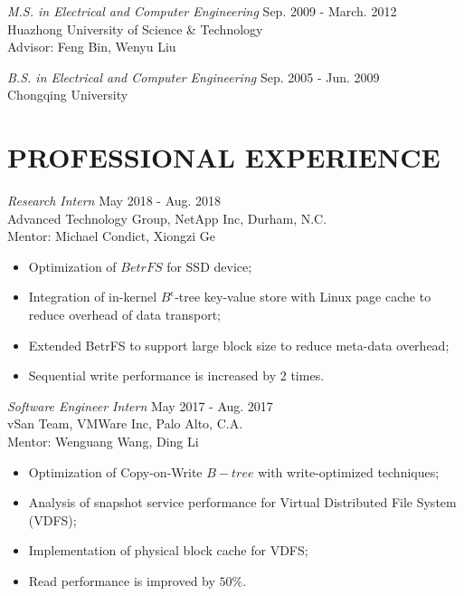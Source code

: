 \documentclass[margin, 10pt]{res} %
\begin{document}
\begin{resume}
{\sl M.S. in Electrical and Computer Engineering} \hfill Sep. 2009 - March. 2012 \\
Huazhong University of Science \& Technology \\
Advisor: Feng Bin, Wenyu Liu

{\sl B.S. in Electrical and Computer Engineering} \hfill Sep. 2005 - Jun. 2009 \\
Chongqing University

 
\section{PROFESSIONAL EXPERIENCE}

{\sl Research Intern} \hfill May 2018 - Aug. 2018 \\
Advanced Technology Group, NetApp Inc, Durham, N.C. \\
Mentor: Michael Condict, Xiongzi Ge
\begin{itemize}
\item Optimization of $BetrFS$ for SSD device;
\item Integration of in-kernel $B^{\epsilon}$-tree key-value store with Linux page cache to reduce overhead of data transport;
\item Extended BetrFS to support large block size to reduce meta-data overhead;
\item Sequential write performance is increased by 2 times.
\end{itemize} 

{\sl Software Engineer Intern} \hfill May 2017 - Aug. 2017 \\
vSan Team, VMWare Inc, Palo Alto, C.A. \\
Mentor: Wenguang Wang, Ding Li
\begin{itemize}
\item Optimization of Copy-on-Write $B-tree$ with write-optimized techniques;
\item Analysis of snapshot service performance for Virtual Distributed File System (VDFS);
\item Implementation of physical block cache for VDFS;
\item Read performance is improved by $50\%$.
\end{itemize}


\end{resume}
\end{document}
